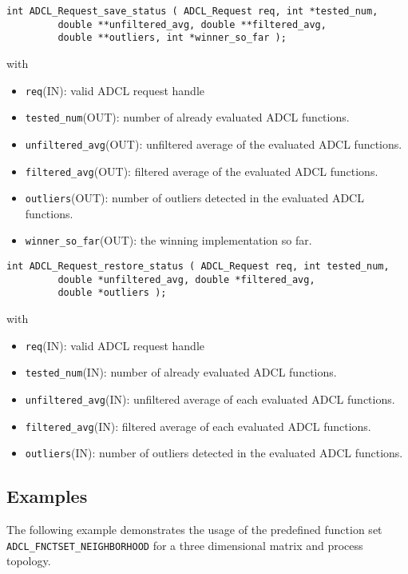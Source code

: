 \begin{verbatim}
int ADCL_Request_save_status ( ADCL_Request req, int *tested_num,
         double **unfiltered_avg, double **filtered_avg,
         double **outliers, int *winner_so_far );
\end{verbatim}
with
\begin{itemize}
\item {\tt req}(IN): valid ADCL request handle
\item {\tt tested\_num}(OUT): number of already evaluated ADCL functions.
\item {\tt unfiltered\_avg}(OUT): unfiltered average of the evaluated ADCL functions.
\item {\tt filtered\_avg}(OUT): filtered average of the evaluated ADCL functions.
\item {\tt outliers}(OUT): number of outliers detected in the evaluated ADCL functions.
\item {\tt winner\_so\_far}(OUT): the winning implementation so far.
\end{itemize}
\begin{verbatim}
int ADCL_Request_restore_status ( ADCL_Request req, int tested_num,
         double *unfiltered_avg, double *filtered_avg,
         double *outliers );
\end{verbatim} 
with
\begin{itemize}
\item {\tt req}(IN): valid ADCL request handle
\item {\tt tested\_num}(IN): number of already evaluated ADCL functions.
\item {\tt unfiltered\_avg}(IN): unfiltered average of each evaluated ADCL functions.
\item {\tt filtered\_avg}(IN): filtered average of each evaluated ADCL functions.
\item {\tt outliers}(IN): number of outliers detected in the evaluated ADCL functions.
\end{itemize}
\subsection{Examples}

The following example demonstrates the usage of the predefined function set {\tt ADCL\_FNCTSET\_NEIGHBORHOOD} for a three dimensional matrix and process topology.

